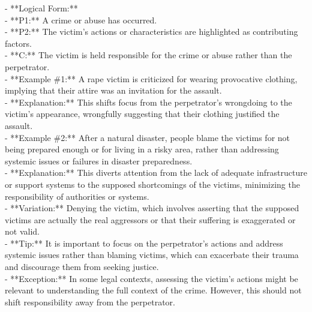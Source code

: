 \documentclass[a4paper,12pt,single,pdftex]{scrbook}
\begin{document}
    
      - **Logical Form:**
    \\

    
        - **P1:** A crime or abuse has occurred.
    \\

    
        - **P2:** The victim's actions or characteristics are highlighted as contributing factors.
    \\

    
        - **C:** The victim is held responsible for the crime or abuse rather than the perpetrator.
    \\

    
      - **Example \#1:** A rape victim is criticized for wearing provocative clothing, implying that their attire was an invitation for the assault.
    \\

    
      - **Explanation:** This shifts focus from the perpetrator's wrongdoing to the victim's appearance, wrongfully suggesting that their clothing justified the assault.
    \\

    
      - **Example \#2:** After a natural disaster, people blame the victims for not being prepared enough or for living in a risky area, rather than addressing systemic issues or failures in disaster preparedness.
    \\

    
      - **Explanation:** This diverts attention from the lack of adequate infrastructure or support systems to the supposed shortcomings of the victims, minimizing the responsibility of authorities or systems.
    \\

    
      - **Variation:** Denying the victim, which involves asserting that the supposed victims are actually the real aggressors or that their suffering is exaggerated or not valid.
    \\

    
      - **Tip:** It is important to focus on the perpetrator’s actions and address systemic issues rather than blaming victims, which can exacerbate their trauma and discourage them from seeking justice.
    \\

    
      - **Exception:** In some legal contexts, assessing the victim's actions might be relevant to understanding the full context of the crime. However, this should not shift responsibility away from the perpetrator.
    \\
\end{document}
